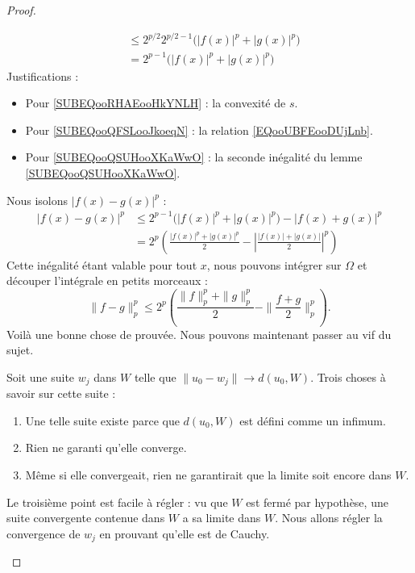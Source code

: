 \begin{proof}
\begin{subproof}
\begin{subequations}
\begin{align}
					                                & \leq  2^{p/2}2^{p/2-1}\big( | f(x) |^p+| g(x) |^p \big)     \label{SUBEQooQSUHooXKaWwO} \\
					                                & =2^{p-1}\big( | f(x) |^p+| g(x) |^p \big)
				\end{align}
			\end{subequations}
			Justifications :
			\begin{itemize}
				\item Pour \eqref{SUBEQooRHAEooHkYNLH} : la convexité de \( s\).
				\item Pour \eqref{SUBEQooQFSLooJkoeqN} : la relation \eqref{EQooUBFEooDUjLnb}.
				\item Pour \eqref{SUBEQooQSUHooXKaWwO} : la seconde inégalité du lemme \ref{SUBEQooQSUHooXKaWwO}.
			\end{itemize}
			Nous isolons \( | f(x)-g(x) |^p\) :
			\begin{subequations}
				\begin{align}
					| f(x)-g(x) |^p & \leq 2^{p-1}\big( | f(x) |^p+| g(x) |^p \big)-| f(x)+g(x) |^p                                       \\
					                & =2^p\left( \frac{ | f(x) |^p+| g(x) |^p }{2}-\left| \frac{ | f(x) |+| g(x) | }{2} \right|^p \right)
				\end{align}
			\end{subequations}
			Cette inégalité étant valable pour tout \( x\), nous pouvons intégrer sur \( \Omega\) et découper l'intégrale en petits morceaux :
			\begin{equation}        \label{EQooVNHSooPXjFNC}
				\| f-g \|^p_p\leq 2^p\left( \frac{ \| f \|_p^p+\| g \|_p^p }{2}- \| \frac{ f+g }{2} \|_p^p \right).
			\end{equation}
			Voilà une bonne chose de prouvée. Nous pouvons maintenant passer au vif du sujet.

			Soit une suite \( w_j\) dans \( W\) telle que \( \| u_0-w_j \|\to d(u_0,W)\). Trois choses à savoir sur cette suite :
			\begin{enumerate}
				\item
				      Une telle suite existe parce que \( d(u_0,W)\) est défini comme un infimum.
				\item
				      Rien ne garanti qu'elle converge.
				\item
				      Même si elle convergeait, rien ne garantirait que la limite soit encore dans \( W\).
			\end{enumerate}
			Le troisième point est facile à régler : vu que \( W\) est fermé par hypothèse, une suite convergente contenue dans \( W\) a sa limite dans \( W\). Nous allons régler la convergence de \( w_j\) en prouvant qu'elle est de Cauchy.


\end{subproof}
\end{proof}
